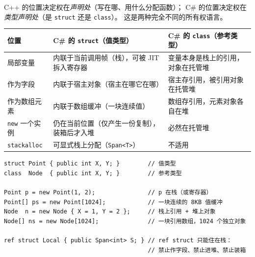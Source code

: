 \documentclass[12pt,a4paper,fontset=fandol]{ctexbook}
\begin{document}
C++ 的位置决定权在\emph{声明处}（写在哪、用什么分配函数）；
C\# 的位置决定权在\emph{类型声明处}（是 \texttt{struct} 还是 \texttt{class}）。
这是两种完全不同的所有权语言。

\begin{longtable}{@{}>{\raggedright\arraybackslash}p{}>{\raggedright\arraybackslash}p{}>{\raggedright\arraybackslash}p{}@{}}
\toprule
\textbf{位置} & \textbf{C\# 的 \texttt{struct}（值类型）} &
  \textbf{C\# 的 \texttt{class}（参考类型）} \\
\midrule
局部变量 & 内联于当前调用帧（栈），可被 JIT 拆入寄存器 &
  变量本身是栈上的引用，对象在托管堆 \\
\addlinespace
作为字段 & 内联于宿主对象（宿主在哪它在哪） &
  宿主存引用，被引用对象在托管堆 \\
\addlinespace
作为数组元素 & 内联于数组缓冲（一块连续值） &
  数组存引用，元素对象各自在堆 \\
\addlinespace
\texttt{new} 一个实例 & 仍在当前位置（仅产生一份复制），
  装箱后才入堆 & 必然在托管堆 \\
\addlinespace
\texttt{stackalloc} & 可显式栈上分配（\texttt{Span<T>}） & 不适用 \\
\bottomrule
\end{longtable}

\begin{lstlisting}[style=csharpstyle,caption={C\#：位置由类型声明决定，不由使用方式决定}]
struct Point { public int X, Y; }        // 值类型
class  Node  { public int X, Y; }        // 参考类型

Point p = new Point(1, 2);               // p 在栈（或寄存器）
Point[] ps = new Point[1024];            // 一块连续的 8KB 值缓冲
Node  n = new Node { X = 1, Y = 2 };     // 栈上引用 + 堆上对象
Node[] ns = new Node[1024];              // 一块引用数组，1024 个独立对象

ref struct Local { public Span<int> S; } // ref struct 只能住在栈：
                                         // 禁止作字段、禁止进堆、禁止装箱
\end{lstlisting}
\end{document}
